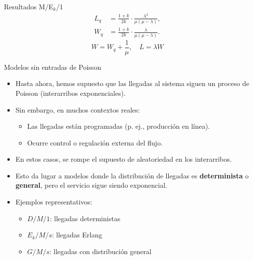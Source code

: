 \documentclass{beamer}
\begin{document}
\begin{frame}{Resultados M/E$_k$/1}
\begin{align*}
L_q &= \frac{1 + k}{2k} \cdot \frac{\lambda^2}{\mu(\mu - \lambda)}, \\
W_q &= \frac{1 + k}{2k} \cdot \frac{\lambda}{\mu(\mu - \lambda)}.
\end{align*}
\[
W = W_q + \frac{1}{\mu}, \quad L = \lambda W
\]
\end{frame}


\begin{frame}{Modelos sin entradas de Poisson}
  \begin{itemize}
    \item Hasta ahora, hemos supuesto que las llegadas al sistema siguen un proceso de Poisson (interarribos exponenciales). \pause

    \item Sin embargo, en muchos contextos reales:
    \begin{itemize}
      \item Las llegadas están programadas (p. ej., producción en línea). \pause
      \item Ocurre control o regulación externa del flujo. \pause
    \end{itemize}

    \item En estos casos, se rompe el supuesto de aleatoriedad en los interarribos. \pause

    \item Esto da lugar a modelos donde la distribución de llegadas es \textbf{determinista} o \textbf{general}, pero el servicio sigue siendo exponencial. \pause

    \item Ejemplos representativos:
    \begin{itemize}
      \item \( D/M/1 \): llegadas deterministas \pause
      \item \( E_k/M/s \): llegadas Erlang \pause
      \item \( G/M/s \): llegadas con distribución general
    \end{itemize}
  \end{itemize}
\end{frame}
\end{document}
